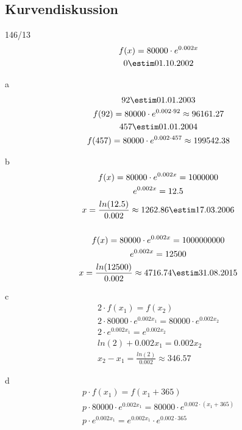 \subsection{Kurvendiskussion}
\begin{exercise}{146/13}
  \begin{gather*}
    f(x) = 80000 \cdot e^{0.002x} \\
    0 \estim 01.10.2002
  \end{gather*}
  \item [a]
  \begin{gather*}
    92 \estim 01.01.2003 \\
    f(92) = 80000 \cdot e^{0.002 \cdot 92} \approx 96161.27 \\
    457 \estim 01.01.2004 \\
    f(457) = 80000 \cdot e^{0.002 \cdot 457} \approx 199542.38 \\
  \end{gather*}
  \item [b]
  \begin{gather*}
    f(x) = 80000 \cdot e^{0.002x} = 1000000 \\
    e^{0.002x} = 12.5 \\
    x = \frac{ln(12.5)}{0.002} \approx 1262.86 \estim 17.03.2006 \\\\
    f(x) = 80000 \cdot e^{0.002x} = 1000000000 \\
    e^{0.002x} = 12500 \\
    x = \frac{ln(12500)}{0.002} \approx 4716.74 \estim 31.08.2015
  \end{gather*}
  \item [c]
  \begin{gather*}
    2 \cdot f(x_1) = f(x_2) \\
    2 \cdot 80000 \cdot e^{0.002x_1} = 80000 \cdot e^{0.002x_2} \\
    2 \cdot e^{0.002x_1} = e^{0.002x_2} \\
    ln(2) + 0.002x_1 = 0.002x_2 \\
    x_2 - x_1 = \frac{ln(2)}{0.002} \approx 346.57
  \end{gather*}
  \item [d]
  \begin{gather*}
    p \cdot f(x_1) = f(x_1 + 365) \\
    p \cdot 80000 \cdot e^{0.002x_1} = 80000 \cdot e^{0.002 \cdot (x_1 + 365)} \\
    p \cdot e^{0.002x_1} = e^{0.002x_1} \cdot e^{0.002 \cdot 365} \\

\end{gather*}
\end{exercise}
